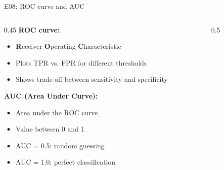 \documentclass[aspectratio=169, 10pt]{beamer}
\begin{document}
\begin{frame}{E08: ROC curve and AUC}
    
    \begin{columns}
        \begin{column}{0.45\textwidth}
            \textbf{ROC curve:}
            \begin{itemize}
                \item \textbf{R}eceiver \textbf{O}perating \textbf{C}haracteristic
                \item Plots TPR vs. FPR for different thresholds
                \item Shows trade-off between sensitivity and specificity
            \end{itemize}
            
            \vspace{3mm}
            
            \textbf{AUC (Area Under Curve):}
            \begin{itemize}
                \item Area under the ROC curve
                \item Value between 0 and 1
                \item AUC = 0.5: random guessing
                \item AUC = 1.0: perfect classification
            \end{itemize}
        \end{column}
        
        \begin{column}{0.5\textwidth}
            \begin{center}
\end{center}
\end{column}
\end{columns}
\end{frame}
\end{document}
